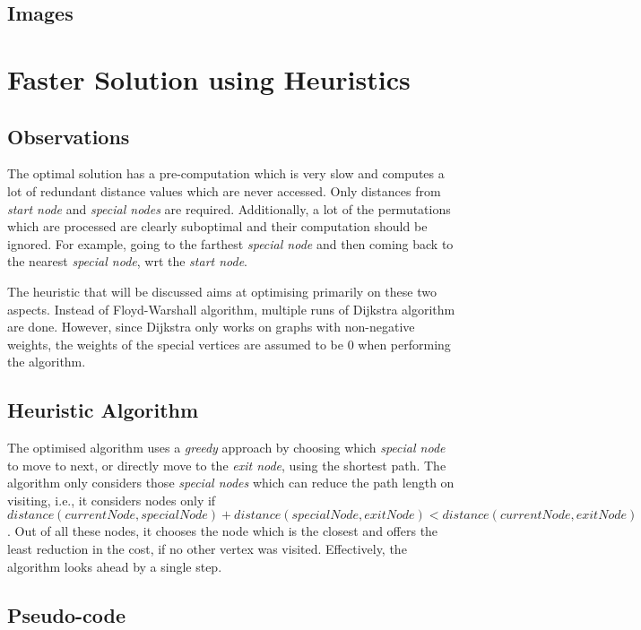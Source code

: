 \documentclass[12pt]{report}
\begin{document}
\section{Images} %

\chapter{Faster Solution using Heuristics}

\section{Observations}
The optimal solution has a pre-computation which is very slow and computes a lot of redundant distance values which are never accessed. Only distances from \textit{start node} and \textit{special nodes} are required. Additionally, a lot of the permutations which are processed are clearly suboptimal and their computation should be ignored. For example, going to the farthest \textit{special node} and then coming back to the nearest \textit{special node}, wrt the \textit{start node}.\par
The heuristic that will be discussed aims at optimising primarily on these two aspects. Instead of Floyd-Warshall algorithm, multiple runs of Dijkstra algorithm are done. However, since Dijkstra only works on graphs with non-negative weights, the weights of the special vertices are assumed to be $0$ when performing the algorithm.

\section{Heuristic Algorithm} %
The optimised algorithm uses a \textit{greedy} approach by choosing which \textit{special node} to move to next, or directly move to the \textit{exit node}, using the shortest path. The algorithm only considers those \textit{special nodes} which can reduce the path length on visiting, i.e., it considers nodes only if ${distance}({currentNode}, {specialNode}) + {distance}({specialNode}, {exitNode}) < {distance}({currentNode}, {exitNode})$. Out of all these nodes, it chooses the node which is the closest and offers the least reduction in the cost, if no other vertex was visited. Effectively, the algorithm looks ahead by a single step.

\section{Pseudo-code}
\end{document}

